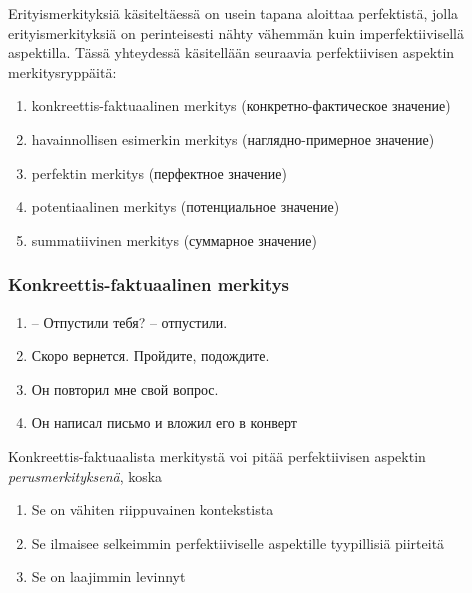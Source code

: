 \documentclass[finnish,russian,]{article}
\begin{document}
Erityismerkityksiä käsiteltäessä on usein tapana aloittaa perfektistä,
jolla erityismerkityksiä on perinteisesti nähty vähemmän kuin
imperfektiivisellä aspektilla. Tässä yhteydessä käsitellään seuraavia
perfektiivisen aspektin merkitysryppäitä:

\begin{enumerate}
\def\labelenumi{\arabic{enumi}.}
\itemsep1pt\parskip0pt
\item
  konkreettis-faktuaalinen merkitys (конкретно-фактическое значение)
\item
  havainnollisen esimerkin merkitys (наглядно-примерное значение)
\item
  perfektin merkitys (перфектное значение)
\item
  potentiaalinen merkitys (потенциальное значение)
\item
  summatiivinen merkitys (суммарное значение)
\end{enumerate}

\subsubsection{Konkreettis-faktuaalinen
merkitys}\label{konkreettis-faktuaalinen-merkitys}

\begin{enumerate}
\def\labelenumi{(\arabic{enumi})}
\itemsep1pt\parskip0pt
\item
  -- Отпустили тебя? -- отпустили.\\
\item
  Скоро вернется. Пройдите, подождите.\\
\item
  Он повторил мне свой вопрос.\\
\item
  Он написал письмо и вложил его в конверт
\end{enumerate}

Konkreettis-faktuaalista merkitystä voi pitää perfektiivisen aspektin
\emph{perusmerkityksenä}, koska

\begin{enumerate}
\def\labelenumi{\alph{enumi}.}
\itemsep1pt\parskip0pt
\item
  Se on vähiten riippuvainen kontekstista
\item
  Se ilmaisee selkeimmin perfektiiviselle aspektille tyypillisiä
  piirteitä
\item
  Se on laajimmin levinnyt
\end{enumerate}
\end{document}
